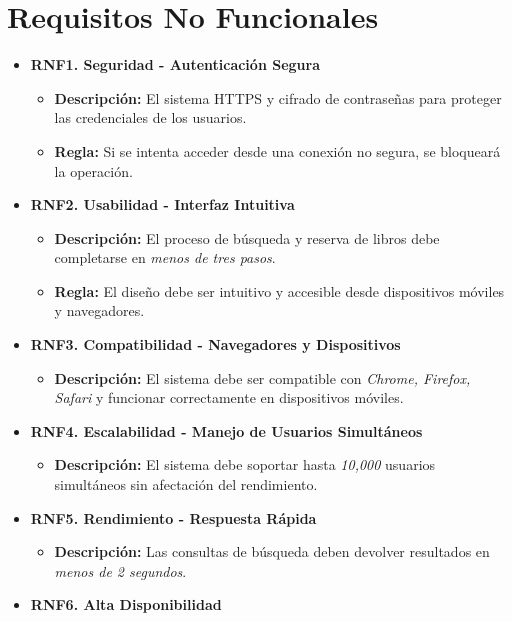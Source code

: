 \documentclass{scrreprt}
\begin{document}
\chapter{Requisitos No Funcionales}
\begin{itemize}
    \item \textbf{RNF1. Seguridad - Autenticación Segura}
    \begin{itemize}
        \item \textbf{Descripción:} El sistema HTTPS y cifrado de contraseñas para proteger las credenciales de los usuarios.
        \item \textbf{Regla:} Si se intenta acceder desde una conexión no segura, se bloqueará la operación.
    \end{itemize}
    \item \textbf{RNF2. Usabilidad - Interfaz Intuitiva}
    \begin{itemize}
        \item \textbf{Descripción:} El proceso de búsqueda y reserva de libros debe completarse en \textit{menos de tres pasos}.
        \item \textbf{Regla:} El diseño debe ser intuitivo y accesible desde dispositivos móviles y navegadores.
    \end{itemize}
    \item \textbf{RNF3. Compatibilidad - Navegadores y Dispositivos}
    \begin{itemize}
        \item \textbf{Descripción:} El sistema debe ser compatible con \textit{Chrome, Firefox, Safari} y funcionar correctamente en dispositivos móviles.
    \end{itemize}
    \item \textbf{RNF4. Escalabilidad - Manejo de Usuarios Simultáneos}
    \begin{itemize}
        \item \textbf{Descripción:} El sistema debe soportar hasta \textit{10,000} usuarios simultáneos sin afectación del rendimiento.
    \end{itemize}
    \item \textbf{RNF5. Rendimiento - Respuesta Rápida}
    \begin{itemize}
        \item \textbf{Descripción:} Las consultas de búsqueda deben devolver resultados en \textit{menos de 2 segundos}.
    \end{itemize}
    \item \textbf{RNF6. Alta Disponibilidad}

\end{itemize}
\end{document}

